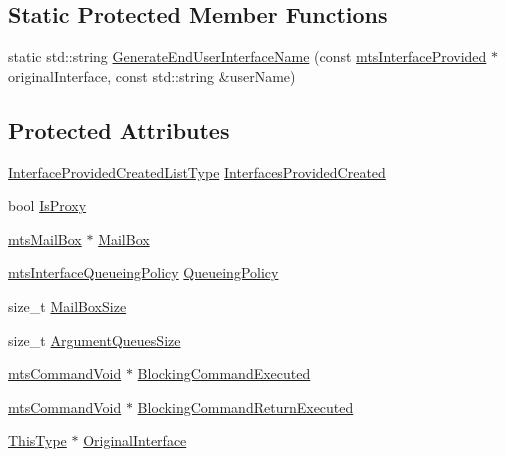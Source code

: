 \subsection*{Static Protected Member Functions}
\begin{DoxyCompactItemize}
\item 
static std\-::string \hyperlink{classmts_interface_provided_a8d07c765ba8331aa2867540176e4e8ad}{Generate\-End\-User\-Interface\-Name} (const \hyperlink{classmts_interface_provided}{mts\-Interface\-Provided} $\ast$original\-Interface, const std\-::string \&user\-Name)
\end{DoxyCompactItemize}
\subsection*{Protected Attributes}
\begin{DoxyCompactItemize}
\item 
\hyperlink{classmts_interface_provided_ae16c05b551c38856866c199bc4551b98}{Interface\-Provided\-Created\-List\-Type} \hyperlink{classmts_interface_provided_abb4914957812afdf0fd27c620cd609a4}{Interfaces\-Provided\-Created}
\item 
bool \hyperlink{classmts_interface_provided_ae1d453e5968c61939ab1a7b8a94389f0}{Is\-Proxy}
\item 
\hyperlink{classmts_mail_box}{mts\-Mail\-Box} $\ast$ \hyperlink{classmts_interface_provided_a99b2ef9d3dec51002e722415589628bb}{Mail\-Box}
\item 
\hyperlink{mts_forward_declarations_8h_abedfb5c45b329a89b0fb647a96a7c938}{mts\-Interface\-Queueing\-Policy} \hyperlink{classmts_interface_provided_aa46d6cd890786ba31c40c8e7882fc9a3}{Queueing\-Policy}
\item 
size\-\_\-t \hyperlink{classmts_interface_provided_a5defbf0829c6a36bbf33baf52ec8f2f0}{Mail\-Box\-Size}
\item 
size\-\_\-t \hyperlink{classmts_interface_provided_ab339fc699adb6b5fcf1b6dbc6369bfac}{Argument\-Queues\-Size}
\item 
\hyperlink{classmts_command_void}{mts\-Command\-Void} $\ast$ \hyperlink{classmts_interface_provided_aa67f46f7ce844bfe7d12f7865b3b4402}{Blocking\-Command\-Executed}
\item 
\hyperlink{classmts_command_void}{mts\-Command\-Void} $\ast$ \hyperlink{classmts_interface_provided_a289d8c80b245bfb5ff2a0bd17b861702}{Blocking\-Command\-Return\-Executed}
\item 
\hyperlink{classmts_interface_provided_a487e1de997186e03ed38d365592fd180}{This\-Type} $\ast$ \hyperlink{classmts_interface_provided_aa3c7fd4efc804d522edf06f02aaf646e}{Original\-Interface}

\end{DoxyCompactItemize}
